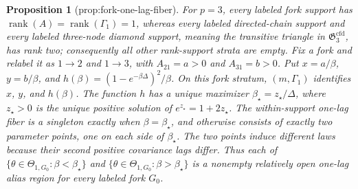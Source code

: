 \documentclass{article}
\newtheorem{proposition}{Proposition}
\begin{document}
\begin{proposition}[prop:fork-one-lag-fiber]\label{prop:fork-one-lag-fiber}
For \(p=3\), every labeled fork support has \(\operatorname{rank}(A)=\operatorname{rank}(\Gamma_1)=1\), whereas every labeled directed-chain support and every labeled three-node diamond support, meaning the transitive triangle in \(\mathfrak G_3^{\mathrm{cfd}}\), has rank two; consequently all other rank-support strata are empty. Fix a fork and relabel it as \(1\to2\) and \(1\to3\), with \(A_{21}=a>0\) and \(A_{31}=b>0\). Put \(x=a/\beta\), \(y=b/\beta\), and \(h(\beta)=(1-e^{-\beta\Delta})^2/\beta\). On this fork stratum, \((m,\Gamma_1)\) identifies \(x\), \(y\), and \(h(\beta)\). The function \(h\) has a unique maximizer \(\beta_\star=z_\star/\Delta\), where \(z_\star>0\) is the unique positive solution of \(e^{z_\star}=1+2z_\star\). The within-support one-lag fiber is a singleton exactly when \(\beta=\beta_\star\), and otherwise consists of exactly two parameter points, one on each side of \(\beta_\star\). The two points induce different laws because their second positive covariance lags differ. Thus each of \(\{\theta\in\Theta_{1,G_0}:\beta<\beta_\star\}\) and \(\{\theta\in\Theta_{1,G_0}:\beta>\beta_\star\}\) is a nonempty relatively open one-lag alias region for every labeled fork \(G_0\).
\end{proposition}
\end{document}
